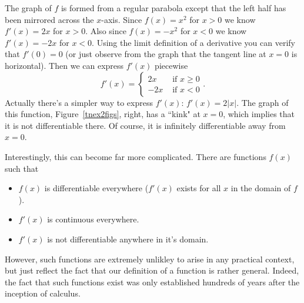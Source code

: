 \begin{bsp}
The graph of $f$ is formed from a regular parabola except that the left half
has been mirrored across the $x$-axis. Since $f(x) = x^2$ for $x>0$ we know
$f'(x) = 2x$ for $x>0$. Also since $f(x) = -x^2$ for $x<0$ we know $f'(x) =
-2x$ for $x<0$. Using the limit definition of a derivative you can verify
that $f'(0) = 0$ (or just observe from the graph that the tangent line at
$x=0$ is horizontal). Then we can express $f'(x)$ piecewise
\[f'(x) = \begin{cases}
2x & \text{ if }x \geq 0 \\
-2x & \text{ if }x < 0
\end{cases}.\]
Actually there's a simpler way to express $f'(x)$: $f'(x) = 2|x|$. The graph
of this function, Figure~\ref{tnex2figs}, right,
has a ``kink" at $x=0$, which implies that it is not differentiable there. 
Of course, it is infinitely differentiable away from $x=0$.
\end{bsp}
Interestingly, this can become far more complicated. There are functions $f(x)$ such that
\begin{itemize}
      \item $f(x)$ is differentiable everywhere ($f'(x)$ exists for all $x$ in the domain of $f$).
      \item $f'(x)$ is continuous everywhere.
      \item $f'(x)$ is not differentiable anywhere in it's domain.
\end{itemize}
However, such functions are extremely unlikley to arise in any practical context,
but just reflect the fact that our definition of a function is rather
general. Indeed, the fact that such functions exist was only established
hundreds of years after the inception of calculus.
